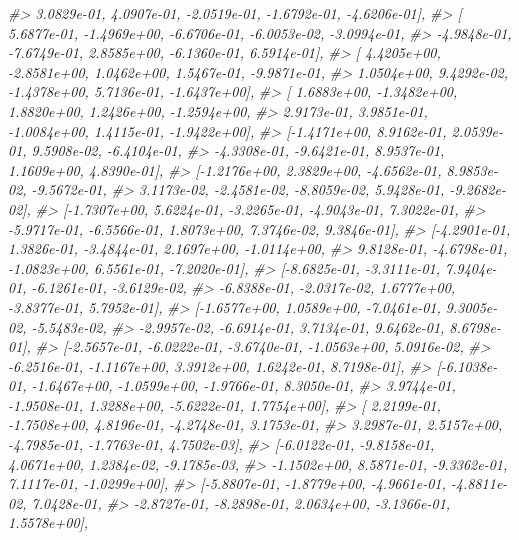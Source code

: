 \documentclass[]{book}
\newenvironment{Shaded}{\begin{snugshade}}{\end{snugshade}}
\newcommand{\CommentTok}[1]{\textcolor[rgb]{0.56,0.35,0.01}{\textit{#1}}}
\begin{document}
\begin{Shaded}
\begin{Highlighting}[]
\CommentTok{#>           3.0829e-01,  4.0907e-01, -2.0519e-01, -1.6792e-01, -4.6206e-01],}
\CommentTok{#>         [ 5.6877e-01, -1.4969e+00, -6.6706e-01, -6.0053e-02, -3.0994e-01,}
\CommentTok{#>          -4.9848e-01, -7.6749e-01,  2.8585e+00, -6.1360e-01,  6.5914e-01],}
\CommentTok{#>         [ 4.4205e+00, -2.8581e+00,  1.0462e+00,  1.5467e-01, -9.9871e-01,}
\CommentTok{#>           1.0504e+00,  9.4292e-02, -1.4378e+00,  5.7136e-01, -1.6437e+00],}
\CommentTok{#>         [ 1.6883e+00, -1.3482e+00,  1.8820e+00,  1.2426e+00, -1.2594e+00,}
\CommentTok{#>           2.9173e-01,  3.9851e-01, -1.0084e+00,  1.4115e-01, -1.9422e+00],}
\CommentTok{#>         [-1.4171e+00,  8.9162e-01,  2.0539e-01,  9.5908e-02, -6.4104e-01,}
\CommentTok{#>          -4.3308e-01, -9.6421e-01,  8.9537e-01,  1.1609e+00,  4.8390e-01],}
\CommentTok{#>         [-1.2176e+00,  2.3829e+00, -4.6562e-01,  8.9853e-02, -9.5672e-01,}
\CommentTok{#>           3.1173e-02, -2.4581e-02, -8.8059e-02,  5.9428e-01, -9.2682e-02],}
\CommentTok{#>         [-1.7307e+00,  5.6224e-01, -3.2265e-01, -4.9043e-01,  7.3022e-01,}
\CommentTok{#>          -5.9717e-01, -6.5566e-01,  1.8073e+00,  7.3746e-02,  9.3846e-01],}
\CommentTok{#>         [-4.2901e-01,  1.3826e-01, -3.4844e-01,  2.1697e+00, -1.0114e+00,}
\CommentTok{#>           9.8128e-01, -4.6798e-01, -1.0823e+00,  6.5561e-01, -7.2020e-01],}
\CommentTok{#>         [-8.6825e-01, -3.3111e-01,  7.9404e-01, -6.1261e-01, -3.6129e-02,}
\CommentTok{#>          -6.8388e-01, -2.0317e-02,  1.6777e+00, -3.8377e-01,  5.7952e-01],}
\CommentTok{#>         [-1.6577e+00,  1.0589e+00, -7.0461e-01,  9.3005e-02, -5.5483e-02,}
\CommentTok{#>          -2.9957e-02, -6.6914e-01,  3.7134e-01,  9.6462e-01,  8.6798e-01],}
\CommentTok{#>         [-2.5657e-01, -6.0222e-01, -3.6740e-01, -1.0563e+00,  5.0916e-02,}
\CommentTok{#>          -6.2516e-01, -1.1167e+00,  3.3912e+00,  1.6242e-01,  8.7198e-01],}
\CommentTok{#>         [-6.1038e-01, -1.6467e+00, -1.0599e+00, -1.9766e-01,  8.3050e-01,}
\CommentTok{#>           3.9744e-01, -1.9508e-01,  1.3288e+00, -5.6222e-01,  1.7754e+00],}
\CommentTok{#>         [ 2.2199e-01, -1.7508e+00,  4.8196e-01, -4.2748e-01,  3.1753e-01,}
\CommentTok{#>           3.2987e-01,  2.5157e+00, -4.7985e-01, -1.7763e-01,  4.7502e-03],}
\CommentTok{#>         [-6.0122e-01, -9.8158e-01,  4.0671e+00,  1.2384e-02, -9.1785e-03,}
\CommentTok{#>          -1.1502e+00,  8.5871e-01, -9.3362e-01,  7.1117e-01, -1.0299e+00],}
\CommentTok{#>         [-5.8807e-01, -1.8779e+00, -4.9661e-01, -4.8811e-02,  7.0428e-01,}
\CommentTok{#>          -2.8727e-01, -8.2898e-01,  2.0634e+00, -3.1366e-01,  1.5578e+00],}

\end{Highlighting}
\end{Shaded}
\end{document}
